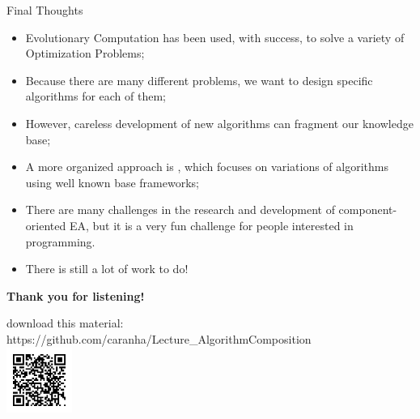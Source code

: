 \documentclass[aspectratio=169]{beamer}
\begin{document}
\begin{frame}{Final Thoughts}
  \begin{itemize}
  \item Evolutionary Computation has been used, with success, to solve
    a variety of Optimization Problems;\medskip

  \item Because there are many different problems, we want to design
    specific algorithms for each of them;\medskip

  \item However, careless development of new algorithms can fragment
    our knowledge base;\medskip

  \item A more organized approach is , which focuses on variations of algorithms using well
    known base frameworks;\medskip

  \item There are many challenges in the research and development of
    component-oriented EA, but it is a very fun challenge for people
    interested in programming.\medskip

  \item There is still a lot of work to do!
  \end{itemize}
\end{frame}

\begin{frame}
  \begin{center}
  {\large{\bf
    Thank you for listening!
  }}
  \end{center}

  \vfill
  
  \footnotesize{download this material:\\
    https://github.com/caranha/Lecture\_AlgorithmComposition}\\
  \includegraphics[width=0.16\textwidth]{img/link.png}

\end{frame}
\end{document}
